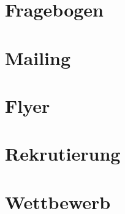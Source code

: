 \section{Fragebogen}\label{app:Fragebogen}

\newpage

\section{Mailing}\label{app:Mailing}

\newpage

\section{Flyer}\label{app:Flyer}

\newpage

\section{Rekrutierung}\label{app:Rekrutierung}

\newpage

\section{Wettbewerb}\label{app:Wettbewerb}

\newpage





%
%
%